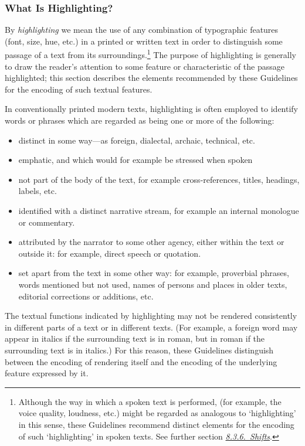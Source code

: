 \subsubsection[{What Is Highlighting?}]{What Is Highlighting?}\label{COHQW}\par
By \textit{highlighting} we mean the use of any combination of typographic features (font, size, hue, etc.) in a printed or written text in order to distinguish some passage of a text from its surroundings.\footnote{Although the way in which a spoken text is performed, (for example, the voice quality, loudness, etc.) might be regarded as analogous to ‘highlighting’ in this sense, these Guidelines recommend distinct elements for the encoding of such ‘highlighting’ in spoken texts. See further section \textit{\hyperref[TSSASH]{8.3.6.\ Shifts}}.} The purpose of highlighting is generally to draw the reader's attention to some feature or characteristic of the passage highlighted; this section describes the elements recommended by these Guidelines for the encoding of such textual features.\par
In conventionally printed modern texts, highlighting is often employed to identify words or phrases which are regarded as being one or more of the following: \begin{itemize}
\item distinct in some way—as foreign, dialectal, archaic, technical, etc.
\item emphatic, and which would for example be stressed when spoken
\item not part of the body of the text, for example cross-references, titles, headings, labels, etc.
\item identified with a distinct narrative stream, for example an internal monologue or commentary.
\item attributed by the narrator to some other agency, either within the text or outside it: for example, direct speech or quotation.
\item set apart from the text in some other way: for example, proverbial phrases, words mentioned but not used, names of persons and places in older texts, editorial corrections or additions, etc.
\end{itemize} \par
The textual functions indicated by highlighting may not be rendered consistently in different parts of a text or in different texts. (For example, a foreign word may appear in italics if the surrounding text is in roman, but in roman if the surrounding text is in italics.) For this reason, these Guidelines distinguish between the encoding of rendering itself and the encoding of the underlying feature expressed by it. \par

